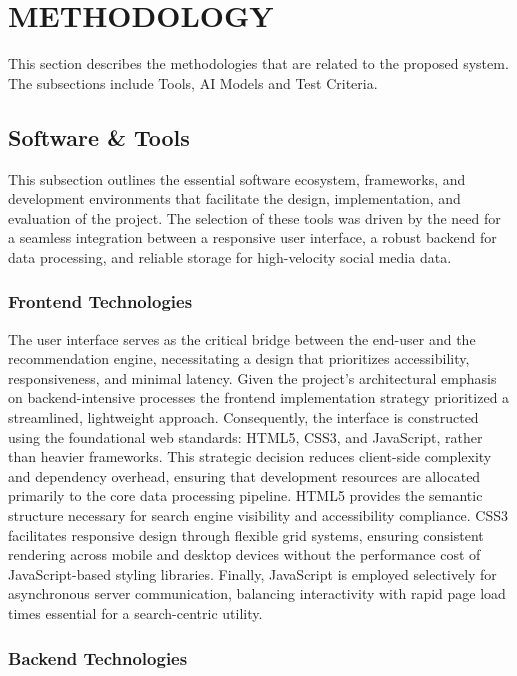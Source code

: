 \documentclass[a4paper,12pt]{report}
\begin{document}
\chapter{METHODOLOGY}

This section describes the methodologies that are related to the proposed system. The
subsections include Tools, AI Models and Test Criteria. 

\section{Software \& Tools}

This subsection outlines the essential software ecosystem, frameworks, and development environments that facilitate the design, implementation, and evaluation of the project. The selection of these tools was driven by the need for a seamless integration between a responsive user interface, a robust backend for data processing, and reliable storage for high-velocity social media data.

\subsection{Frontend Technologies}

The user interface serves as the critical bridge between the end-user and the recommendation engine, necessitating a design that prioritizes accessibility, responsiveness, and minimal latency. Given the project's architectural emphasis on backend-intensive processes the frontend implementation strategy prioritized a streamlined, lightweight approach. Consequently, the interface is constructed using the foundational web standards: HTML5, CSS3, and JavaScript, rather than heavier frameworks.
This strategic decision reduces client-side complexity and dependency overhead, ensuring that development resources are allocated primarily to the core data processing pipeline. HTML5 provides the semantic structure necessary for search engine visibility and accessibility compliance. CSS3 facilitates responsive design through flexible grid systems, ensuring consistent rendering across mobile and desktop devices without the performance cost of JavaScript-based styling libraries. Finally, JavaScript is employed selectively for asynchronous server communication, balancing interactivity with rapid page load times essential for a search-centric utility.

\subsection{Backend Technologies}
\end{document}
